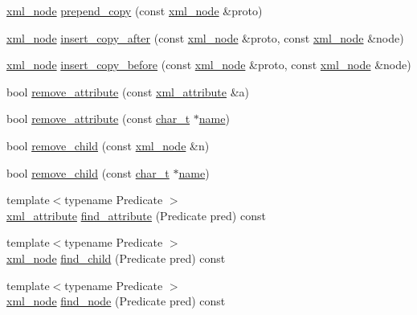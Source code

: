 \begin{DoxyCompactItemize}
\item 
\hyperlink{classpugi_1_1xml__node}{xml\-\_\-node} \hyperlink{classpugi_1_1xml__node_a29cc787ee2270e3a71e1d511164621e6}{prepend\-\_\-copy} (const \hyperlink{classpugi_1_1xml__node}{xml\-\_\-node} \&proto)
\item 
\hyperlink{classpugi_1_1xml__node}{xml\-\_\-node} \hyperlink{classpugi_1_1xml__node_a106a600eac7d08608f797d034b331fa8}{insert\-\_\-copy\-\_\-after} (const \hyperlink{classpugi_1_1xml__node}{xml\-\_\-node} \&proto, const \hyperlink{classpugi_1_1xml__node}{xml\-\_\-node} \&node)
\item 
\hyperlink{classpugi_1_1xml__node}{xml\-\_\-node} \hyperlink{classpugi_1_1xml__node_a21134448747e00888df7ecfb174032d3}{insert\-\_\-copy\-\_\-before} (const \hyperlink{classpugi_1_1xml__node}{xml\-\_\-node} \&proto, const \hyperlink{classpugi_1_1xml__node}{xml\-\_\-node} \&node)
\item 
bool \hyperlink{classpugi_1_1xml__node_aee02f0e2dab4aaeb6196f26b3bcf258c}{remove\-\_\-attribute} (const \hyperlink{classpugi_1_1xml__attribute}{xml\-\_\-attribute} \&a)
\item 
bool \hyperlink{classpugi_1_1xml__node_a2625858b335a1289d72d19b57acc639c}{remove\-\_\-attribute} (const \hyperlink{namespacepugi_aef5a7a62cba0507542220ea15afe39df}{char\-\_\-t} $\ast$\hyperlink{classpugi_1_1xml__node_ac765caace42ecf252d90aea81e09df57}{name})
\item 
bool \hyperlink{classpugi_1_1xml__node_a4b562d01edab7dad880e9e297203843d}{remove\-\_\-child} (const \hyperlink{classpugi_1_1xml__node}{xml\-\_\-node} \&n)
\item 
bool \hyperlink{classpugi_1_1xml__node_a1930157197e41cc15eea1fc00eecf1dd}{remove\-\_\-child} (const \hyperlink{namespacepugi_aef5a7a62cba0507542220ea15afe39df}{char\-\_\-t} $\ast$\hyperlink{classpugi_1_1xml__node_ac765caace42ecf252d90aea81e09df57}{name})
\item 
{\footnotesize template$<$typename Predicate $>$ }\\\hyperlink{classpugi_1_1xml__attribute}{xml\-\_\-attribute} \hyperlink{classpugi_1_1xml__node_a4e0125eb6c0857df370119df923096ea}{find\-\_\-attribute} (Predicate pred) const 
\item 
{\footnotesize template$<$typename Predicate $>$ }\\\hyperlink{classpugi_1_1xml__node}{xml\-\_\-node} \hyperlink{classpugi_1_1xml__node_a25b60f2847c1937f0d4dbd4828bdcd7d}{find\-\_\-child} (Predicate pred) const 
\item 
{\footnotesize template$<$typename Predicate $>$ }\\\hyperlink{classpugi_1_1xml__node}{xml\-\_\-node} \hyperlink{classpugi_1_1xml__node_a28ccb61937080e9cefe991a0c6837be6}{find\-\_\-node} (Predicate pred) const 

\end{DoxyCompactItemize}
